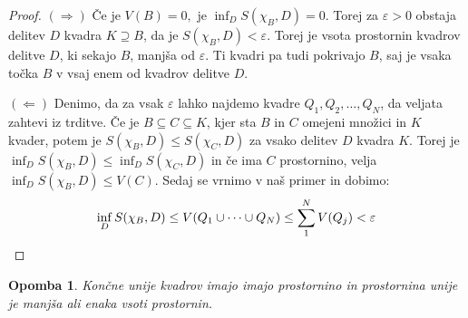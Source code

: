 \documentclass[10pt, a4paper]{article}
\newtheorem*{opomba}{Opomba}
\newenvironment{noticeC}{%
  \tcolorbox[%
  notitle,
  empty,
  enhanced,  %
  breakable,
  coltext=black, 
  fontupper=\rmfamily,
  parbox=false,
  noparskip,
  sharp corners,
  boxrule=-1pt,  %
  frame hidden,
  left=7pt,  %
  right=7pt,
  top=5pt,
  bottom=5pt,
  before skip=2.5ex plus 2pt,
  after skip=2.5ex plus 2pt,
  overlay unbroken and last={%
  },
  ]}
{\endtcolorbox}
\newenvironment{dokaz}%
  {\begin{noticeC}\begin{proof}}%
  {\end{proof}\end{noticeC}}
\begin{document}
\begin{dokaz}
    $(\Rightarrow)$ Če je $V(B) = 0,$ je $\inf_D S(\chi_B, D) = 0$.
    Torej za $\varepsilon >0$ obstaja delitev $D$ kvadra $K \supseteq B$, da je 
    $S(\chi_B, D) < \varepsilon$.
    Torej je vsota prostornin kvadrov delitve $D$, ki sekajo $B$, manjša od $\varepsilon$.
    Ti kvadri pa tudi pokrivajo $B$, saj je vsaka točka $B$ v vsaj enem od kvadrov delitve $D$.

    $(\Leftarrow)$ Denimo, da za vsak $\varepsilon$ lahko najdemo kvadre $Q_1, Q_2, \dots, Q_N$,
    da veljata zahtevi iz trditve.
    Če je $B \subseteq C \subseteq K$, kjer sta $B$ in $C$ omejeni množici in $K$ kvader,
    potem je $S(\chi_B, D) \leq S(\chi_C, D)$ za vsako delitev $D$ kvadra $K$.
    Torej je $\inf_D S(\chi_B, D) \leq \inf_D S(\chi_C, D)$ in če ima $C$ prostornino, velja 
    $\inf_D S(\chi_B, D) \leq V(C)$. Sedaj se vrnimo v naš primer in dobimo:
    \begin{equation*}
        \inf_D S(\chi_B, D) \leq V(Q_1 \cup \dots \cup Q_N) \leq \sum_1 ^N V(Q_j) < \varepsilon \qedhere
    \end{equation*}
\end{dokaz}

\begin{opomba}
    Končne unije kvadrov imajo imajo prostornino in prostornina unije 
    je manjša ali enaka vsoti prostornin.
\end{opomba}
\end{document}
